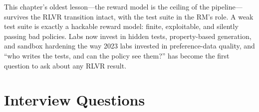 \begin{keyinsight}
This chapter's oldest lesson---the reward model is the ceiling of the
pipeline---survives the RLVR transition intact, with the test suite in
the RM's role.  A weak test suite is exactly a hackable reward model:
finite, exploitable, and silently passing bad policies.  Labs now invest
in hidden tests, property-based generation, and sandbox hardening the
way 2023 labs invested in preference-data quality, and ``who writes the
tests, and can the policy see them?'' has become the first question to
ask about any RLVR result.
\end{keyinsight}


\section{Interview Questions}
\label{sec:alignment_interview}

